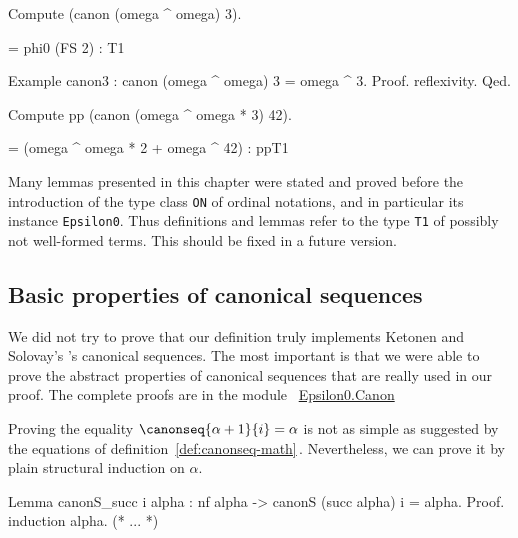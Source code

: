 \begin{Coqsrc}
Compute (canon (omega ^ omega) 3).
\end{Coqsrc}

\begin{Coqanswer}
  = phi0 (FS 2) : T1
\end{Coqanswer}

\begin{Coqsrc}
Example canon3 :  canon (omega ^ omega) 3 = omega ^ 3.
Proof. reflexivity. Qed.
\end{Coqsrc}


\begin{Coqsrc}
Compute pp (canon (omega ^ omega * 3) 42).  
\end{Coqsrc}

\begin{Coqanswer}
    = (omega ^ omega * 2 + omega ^ 42)%
     : ppT1
\end{Coqanswer}

\begin{project}
Many lemmas presented in this chapter were stated and proved before the introduction of 
the type class \texttt{ON} of ordinal notations, and in particular its  instance \texttt{Epsilon0}.
Thus definitions and lemmas refer to the type \texttt{T1} of possibly not well-formed terms.
This should be fixed in  a future version.
\end{project}


\subsection{Basic properties of canonical sequences}

We did not  try to prove that our definition truly implements Ketonen and Solovay's  \cite{KS81}'s canonical sequences. The most important is that we were able to prove the 
abstract properties  of canonical sequences that are really used in our proof. The complete proofs are in the module
~\href{../theories/html/hydras.Epsilon0.Canon.html}{Epsilon0.Canon}


Proving the equality $\canonseq{\alpha+1}{i}=\alpha$ is not 
as simple as suggested by the equations of definition~\ref{def:canonseq-math}\,.
Nevertheless, we can prove it by  plain structural induction on $\alpha$.

\begin{Coqsrc}
Lemma canonS_succ i alpha :
  nf alpha ->  canonS (succ alpha) i = alpha.
Proof.
 induction alpha.
 (* ... *)
\end{Coqsrc}

